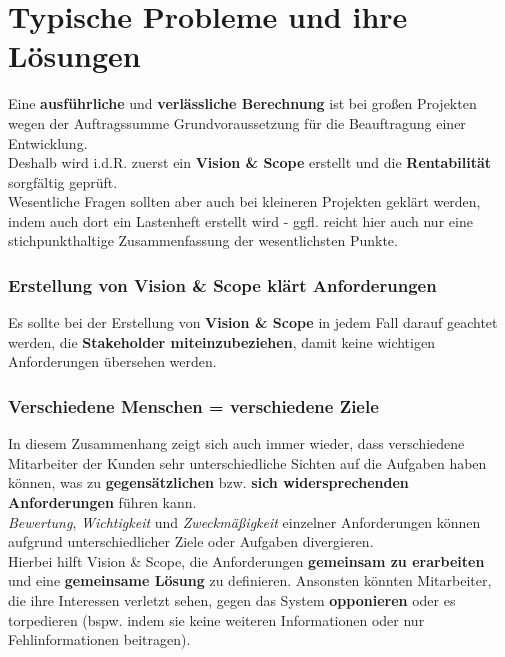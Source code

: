 \section{Typische Probleme und ihre Lösungen}

Eine \textbf{ausführliche} und \textbf{verlässliche Berechnung} ist bei großen Projekten wegen der Auftragssumme Grundvoraussetzung für die Beauftragung einer Entwicklung.\\

\noindent
Deshalb wird i.d.R. zuerst ein \textbf{Vision \& Scope} erstellt und die \textbf{Rentabilität} sorgfältig geprüft.\\

\noindent
Wesentliche Fragen sollten aber auch bei kleineren Projekten geklärt werden, indem auch dort ein Lastenheft erstellt wird - ggfl. reicht hier auch nur eine stichpunkthaltige Zusammenfassung der wesentlichsten Punkte.\\

\subsubsection*{Erstellung von Vision \& Scope klärt Anforderungen}
Es sollte bei der Erstellung von \textbf{Vision \& Scope} in jedem Fall darauf geachtet werden, die \textbf{Stakeholder miteinzubeziehen}, damit keine wichtigen Anforderungen übersehen werden.\\

\subsubsection*{Verschiedene Menschen = verschiedene Ziele}
In diesem Zusammenhang zeigt sich auch immer wieder, dass verschiedene Mitarbeiter der Kunden sehr unterschiedliche Sichten auf die Aufgaben haben können, was zu \textbf{gegensätzlichen} bzw. \textbf{sich widersprechenden Anforderungen} führen kann.\\
\textit{Bewertung}, \textit{Wichtigkeit} und \textit{Zweckmäßigkeit} einzelner Anforderungen können aufgrund unterschiedlicher Ziele oder Aufgaben divergieren.\\
Hierbei hilft Vision \& Scope, die Anforderungen \textbf{gemeinsam zu erarbeiten} und eine \textbf{gemeinsame Lösung} zu definieren.
Ansonsten könnten Mitarbeiter, die ihre Interessen verletzt sehen, gegen das System \textbf{opponieren} oder es torpedieren (bspw. indem sie keine weiteren Informationen oder nur Fehlinformationen beitragen).\\

